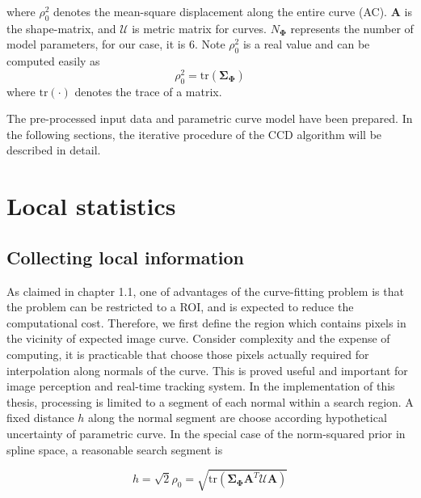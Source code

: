 where $\rho_0^2$ denotes the mean-square displacement along the entire
curve (AC). $\mathbf{A}$ is the shape-matrix, and $\mathcal{U}$ is
metric matrix for curves. $N_{\mathbf{\Phi}}$ represents
the number of model parameters, for our case, it is 6. Note $\rho_0^2$
is a real value and can be computed easily as 
\begin{equation}
  \label{eq:5.3}
  \rho_0^2 = \mathrm{tr}(\mathbf{\Sigma}_{\mathbf{\Phi}})
\end{equation}
where $\mathrm{tr}(\cdot)$ denotes the trace of a matrix.

The pre-processed input data and parametric curve model have been
prepared. In the following sections, the iterative procedure of the
CCD algorithm will be described in detail.

\section{Local statistics}
\label{sec:ls}

\subsection{Collecting local information}
\label{sec:cls}


As claimed in chapter 1.1, one of advantages of the curve-fitting
problem is that the problem can be restricted to a ROI, and is
expected to reduce the computational cost. Therefore, we first define
the region which contains pixels in the vicinity of expected image
curve. 
Consider complexity and the expense of computing, it is practicable
that choose those pixels actually required for interpolation along
normals of the curve. This is proved useful and important for image
perception and real-time tracking system. In the implementation of
this thesis, processing is limited to a segment of each normal within
a search region. A fixed distance $h$ along the normal segment are
choose according hypothetical uncertainty of parametric curve. In the
special case of the norm-squared prior in spline space, a reasonable
search segment is 

\begin{equation}
  \label{eq:5.4}
  h = \sqrt{2} \rho_0 = \sqrt{\mathrm{tr}(\mathbf{\Sigma}_{\mathbf{\Phi}}\mathbf{A}^T\mathcal{U}\mathbf{A})}
\end{equation}

